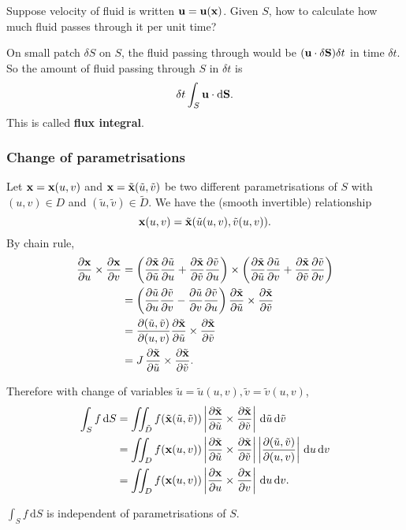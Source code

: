 \begin{example}
    Suppose velocity of fluid is written $ {\bf u}={\bf u}({\bf x}) $. Given $S$, how to calculate how much fluid passes through it per unit time?

    On small patch $ \delta S $ on $S$, the fluid passing through would be $ ({\bf u} \cdot \delta{\bf S})\delta t$ in time $ \delta t $. So the amount of fluid passing through $S$ in $ \delta t $ is 
    \[
        \delta t \int_{S} {\bf u} \cdot \mathrm{d}{\bf S}.
    \]
    This is called \textbf{flux integral}.
\end{example}

\subsubsection*{Change of parametrisations}
Let $ {\bf x}={\bf x}(u,v) $ and $ {\bf x} = \tilde{{\bf x}}(\tilde{u},\tilde{v}) $ be two different parametrisations of $S$ with $ (u,v)\in D $ and $ (\tilde{u},\tilde{v})\in \tilde{D} $. We have the (smooth invertible) relationship 
\[
    {\bf x}(u,v) = \tilde{{\bf x}}(\tilde{u}(u,v),\tilde{v}(u,v)).
\]
By chain rule,
\begin{align*}
    \frac{\partial {\bf x}}{\partial u}\times \frac{\partial {\bf x}}{\partial v} &= \left( \frac{\partial \tilde{{\bf x}}}{\partial \tilde{u}}\frac{\partial \tilde{u}}{\partial u}+ \frac{\partial \tilde{{\bf x}}}{\partial \tilde{v}}\frac{\partial \tilde{v}}{\partial u}  \right) \times \left( \frac{\partial \tilde{{\bf x}}}{\partial \tilde{u}}\frac{\partial \tilde{u}}{\partial v}+\frac{\partial \tilde{{\bf x}}}{\partial \tilde{v}}\frac{\partial \tilde{v}}{\partial v} \right)\\ 
    &= \left( \frac{\partial \tilde{u}}{\partial u}\frac{\partial \tilde{v}}{\partial v}-\frac{\partial \tilde{u}}{\partial v}\frac{\partial \tilde{v}}{\partial u} \right)\frac{\partial \tilde{{\bf x}}}{\partial \tilde{u}}\times \frac{\partial \tilde{{\bf x}}}{\partial \tilde{v}}\\ 
    &=\frac{\partial (\tilde{u},\tilde{v})}{\partial (u,v)} \frac{\partial \tilde{{\bf x}}}{\partial \tilde{u}}\times \frac{\partial \tilde{{\bf x}}}{\partial \tilde{v}}\\ 
    &= J\,\frac{\partial \tilde{{\bf x}}}{\partial \tilde{u}}\times \frac{\partial \tilde{{\bf x}}}{\partial \tilde{v}}.
\end{align*}

Therefore with change of variables $ \tilde{u}=\tilde{u}(u,v),\tilde{v}=\tilde{v}(u,v) $,
\begin{align*}
    \int_{S} f \,\mathrm{d}S &= \iint_{\tilde{D}} f(\tilde{{\bf x}}(\tilde{u},\tilde{v})) \left|\frac{\partial \tilde{{\bf x}}}{\partial \tilde{u}}\times \frac{\partial \tilde{{\bf x}}}{\partial \tilde{v}}  \right| \,\mathrm{d} \tilde{u}\,\mathrm{d} \tilde{v}\\ 
    &= \iint_{D} f({\bf x}(u,v)) \left|\frac{\partial \tilde{{\bf x}}}{\partial \tilde{u}}\times \frac{\partial \tilde{{\bf x}}}{\partial \tilde{v}}  \right| \left| \frac{\partial (\tilde{u},\tilde{v})}{\partial (u,v)} \right| \,\mathrm{d} u\,\mathrm{d} v\\ 
    &= \iint_{D} f({\bf x}(u,v)) \left| \frac{\partial {\bf x}}{\partial u}\times \frac{\partial {\bf x}}{\partial v} \right| \,\mathrm{d} u \,\mathrm{d} v.
\end{align*}

\begin{proposition}
    $\displaystyle \int_{S} f \,\mathrm{d}S$ is independent of parametrisations of $S$.
\end{proposition}